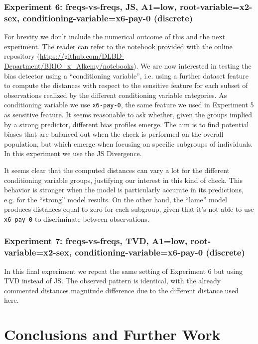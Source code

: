 \documentclass[
]{ceurart}
\begin{document}
\subsubsection{Experiment 6: freqs-vs-freqs, JS, A1=low, root-variable=x2-sex, conditioning-variable=x6-pay-0 (discrete)}
For brevity we don't include the numerical outcome of this and the next experiment. The reader can refer to the notebook provided with the online repository (\url{https://github.com/DLBD-Department/BRIO_x_Alkemy/notebooks}). We are now interested in testing the bias detector using a ``conditioning variable'', i.e. using a further dataset feature to compute the distances with respect to the sensitive feature for each subset of observations realized by the different conditioning variable categories. As conditioning variable we use \texttt{x6-pay-0}, the same feature we used in Experiment 5 as sensitive feature. It seems reasonable to ask whether, given the groups implied by a strong predictor, different bias profiles emerge. The aim is to find potential biases that are balanced out when the check is performed on the overall population, but which emerge when focusing on specific subgroups of individuals. In this experiment we use the JS Divergence. 

It seems clear that the computed distances can vary a lot for the different conditioning variable groups, justifying our interest in this kind of check. This behavior is stronger when the model is particularly accurate in its predictions, e.g. for the ``strong'' model results. On the other hand, the ``lame'' model produces distances equal to zero for each subgroup, given that it's not able to use \texttt{x6-pay-0} to discriminate between observations. 

\subsubsection{Experiment 7: freqs-vs-freqs, TVD, A1=low, root-variable=x2-sex, conditioning-variable=x6-pay-0 (discrete)}
In this final experiment we repeat the same setting of Experiment 6 but using TVD instead of JS. The observed pattern is identical, with the already commented distances magnitude difference due to the different distance used here. 

\section{Conclusions and Further Work}
\label{sec:conclusions}
\end{document}
